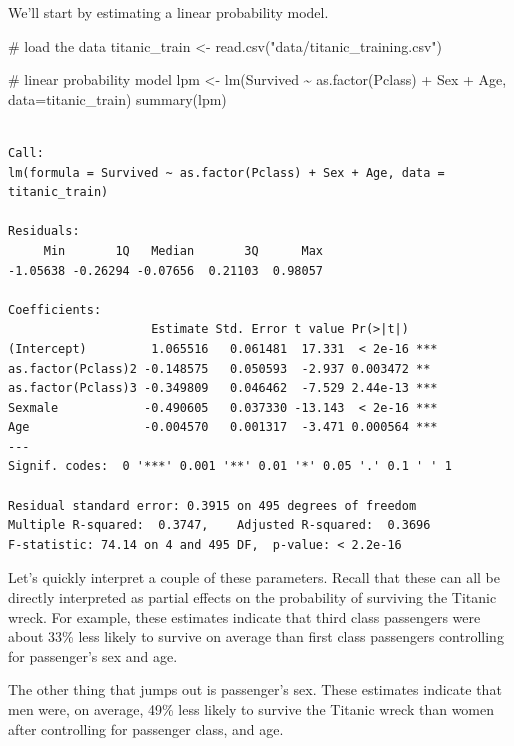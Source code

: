 \documentclass[
  letterpaper,
  DIV=11,
  numbers=noendperiod]{scrreprt}
\newenvironment{Shaded}{\begin{snugshade}}{\end{snugshade}}
\newcommand{\AttributeTok}[1]{\textcolor[rgb]{0.40,0.45,0.13}{#1}}
\newcommand{\CommentTok}[1]{\textcolor[rgb]{0.37,0.37,0.37}{#1}}
\newcommand{\FunctionTok}[1]{\textcolor[rgb]{0.28,0.35,0.67}{#1}}
\newcommand{\NormalTok}[1]{\textcolor[rgb]{0.00,0.23,0.31}{#1}}
\newcommand{\OtherTok}[1]{\textcolor[rgb]{0.00,0.23,0.31}{#1}}
\newcommand{\SpecialCharTok}[1]{\textcolor[rgb]{0.37,0.37,0.37}{#1}}
\newcommand{\StringTok}[1]{\textcolor[rgb]{0.13,0.47,0.30}{#1}}
\begin{document}
We'll start by estimating a linear probability model.

\begin{Shaded}
\begin{Highlighting}[]
\CommentTok{\# load the data}
\NormalTok{titanic\_train }\OtherTok{\textless{}{-}} \FunctionTok{read.csv}\NormalTok{(}\StringTok{"data/titanic\_training.csv"}\NormalTok{)}

\CommentTok{\# linear probability model}
\NormalTok{lpm }\OtherTok{\textless{}{-}} \FunctionTok{lm}\NormalTok{(Survived }\SpecialCharTok{\textasciitilde{}} \FunctionTok{as.factor}\NormalTok{(Pclass) }\SpecialCharTok{+} 
\NormalTok{            Sex }\SpecialCharTok{+}\NormalTok{ Age, }
          \AttributeTok{data=}\NormalTok{titanic\_train)}
\FunctionTok{summary}\NormalTok{(lpm)}
\end{Highlighting}
\end{Shaded}

\begin{verbatim}

Call:
lm(formula = Survived ~ as.factor(Pclass) + Sex + Age, data = titanic_train)

Residuals:
     Min       1Q   Median       3Q      Max 
-1.05638 -0.26294 -0.07656  0.21103  0.98057 

Coefficients:
                    Estimate Std. Error t value Pr(>|t|)    
(Intercept)         1.065516   0.061481  17.331  < 2e-16 ***
as.factor(Pclass)2 -0.148575   0.050593  -2.937 0.003472 ** 
as.factor(Pclass)3 -0.349809   0.046462  -7.529 2.44e-13 ***
Sexmale            -0.490605   0.037330 -13.143  < 2e-16 ***
Age                -0.004570   0.001317  -3.471 0.000564 ***
---
Signif. codes:  0 '***' 0.001 '**' 0.01 '*' 0.05 '.' 0.1 ' ' 1

Residual standard error: 0.3915 on 495 degrees of freedom
Multiple R-squared:  0.3747,    Adjusted R-squared:  0.3696 
F-statistic: 74.14 on 4 and 495 DF,  p-value: < 2.2e-16
\end{verbatim}

Let's quickly interpret a couple of these parameters. Recall that these
can all be directly interpreted as partial effects on the probability of
surviving the Titanic wreck. For example, these estimates indicate that
third class passengers were about 33\% less likely to survive on average
than first class passengers controlling for passenger's sex and age.

The other thing that jumps out is passenger's sex. These estimates
indicate that men were, on average, 49\% less likely to survive the
Titanic wreck than women after controlling for passenger class, and age.
\end{document}
